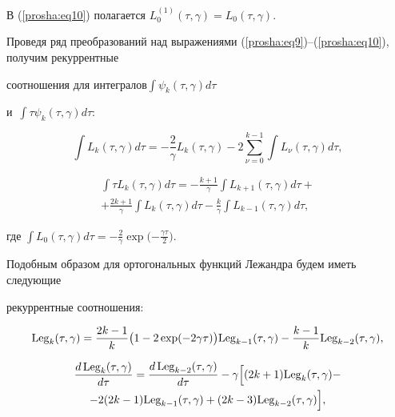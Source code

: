 В (\ref{prosha:eq10}) полагается $L_0^{ ( 1 )}  ( \tau , \gamma  )=L_0( \tau , \gamma  )$.



Проведя ряд преобразований над выражениями (\ref{prosha:eq9})--(\ref{prosha:eq10}), получим рекуррентные

соотношения для интегралов$\displaystyle \int \psi _k  (\tau , \gamma )d\tau $

и~$\displaystyle \int \tau \psi _k  (\tau, \gamma )d\tau $:

\[

\int L_k  ( \tau , \gamma  )d\tau  =-\frac{2}{\gamma }L_k ( \tau , \gamma  )

-2\sum\limits_{\nu =0}^{k-1} \int L_\nu  ( \tau , \gamma  )d\tau ,

\]

\begin{multline*}

\int \tau  L_k  ( \tau , \gamma  )d\tau  =-\frac{k+1}{\gamma}

\int L_{k+1}  ( \tau , \gamma  )d\tau  + \\

+\frac{2k+1}{\gamma } \int L_k  ( \tau , \gamma  )d\tau  -\frac{k}{\gamma }\int

L_{k-1}  ( \tau , \gamma  )d\tau ,

\end{multline*}

где ${\displaystyle \int L_0  ( \tau , \gamma  )d\tau  }=-\frac{2}{\gamma}\exp\bigl({-\frac{\gamma \tau }{2}}\bigr)$.



Подобным образом для ортогональных функций Лежандра будем иметь следующие

рекуррентные соотношения:

\begin{equation}

\label{prosha:eq12}

{\rm Leg}_k ( \tau , \gamma  )=\frac{2k-1}{k} \bigl( 1-2\exp({-2\gamma \tau })  \bigr){\rm Leg}_{k-1}  ( \tau , \gamma  )-\frac{k-1}{k}{\rm Leg}_{k-2}  ( \tau , \gamma  ),

\end{equation}

\begin{multline}

\label{prosha:eq13}

 \frac{d\,{\rm Leg}_k  ( \tau , \gamma  )}{d\tau }=\frac{d\,{\rm Leg}_{k-2}  (\tau , \gamma  ) }{d\tau }-

\gamma \Bigl[

(2k+1) {\rm Leg}_k  ( \tau , \gamma  )-\\

-2 (2k-1){\rm Leg}_{k-1}  (\tau, \gamma  )

+ (2k-3){\rm Leg}_{k-2}  ( \tau , \gamma  ) \Bigr ],

\end{multline}

